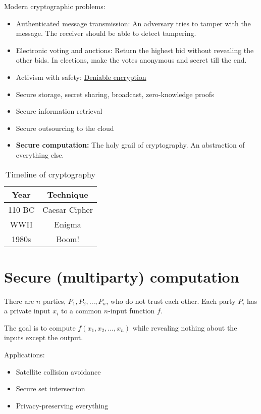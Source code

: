 Modern cryptographic problems:
\begin{itemize}
    \item Authenticated message transmission:
        An adversary tries to tamper with the message.
        The receiver should be able to detect tampering.
    \item Electronic voting and auctions:
        Return the highest bid without revealing the other bids.
        In elections, make the votes anonymous and secret till the end.
    \item Activism with safety:
        \href{https://en.wikipedia.org/wiki/Deniable_encryption}
        {Deniable encryption}
    \item Secure storage, secret sharing, broadcast, zero-knowledge proofs
    \item Secure information retrieval
    \item Secure outsourcing to the cloud
    \item \textbf{Secure computation:} The holy grail of cryptography.
        An abstraction of everything else.
\end{itemize}
\begin{table}
    \centering
    \begin{tabular}{cc}
        \toprule
        \textbf{Year} & \textbf{Technique} \\
        \midrule
        110 BC & Caesar Cipher \\
        WWII   & Enigma \\
        1980s  & Boom! \\
        \bottomrule
    \end{tabular}
    \caption{Timeline of cryptography}
    \label{tab:timeline}
\end{table}

\section{Secure (multiparty) computation} \label{sec:mpc}
\begin{setting*}
    There are $n$ parties, $P_1, P_2, \dots, P_n$,
    who do not trust each other.
    Each party $P_i$ has a private input $x_i$ to a common
    $n$-input function $f$.

    The goal is to compute $f(x_1, x_2, \dots, x_n)$
    while revealing nothing about the inputs except the output.
\end{setting*}
Applications:
\begin{itemize}
    \item Satellite collision avoidance
    \item Secure set intersection
    \item Privacy-preserving everything
\end{itemize}

